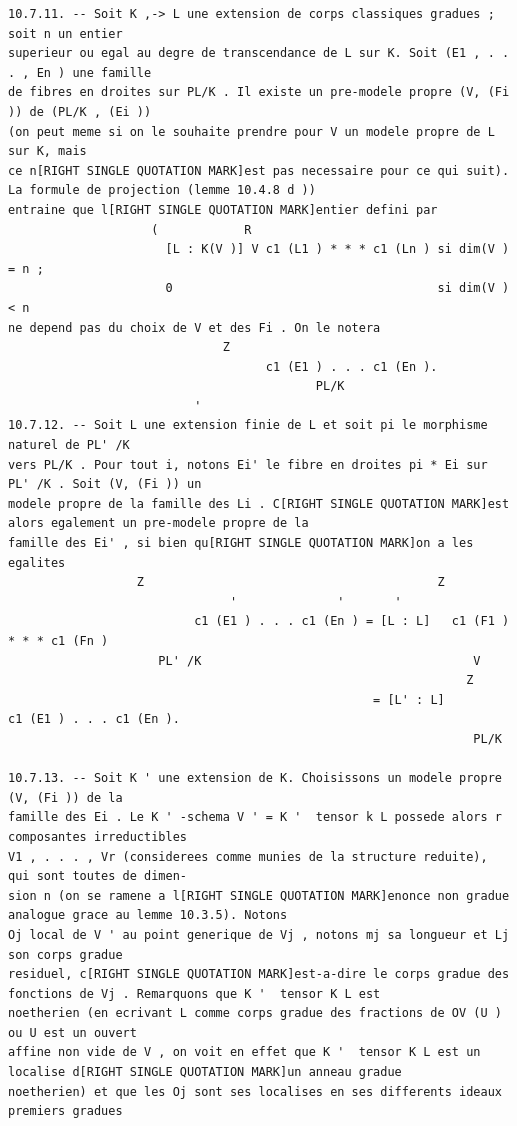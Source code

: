 \documentclass[
  11pt,
]{article}
\begin{document}
\begin{lstlisting}
10.7.11. -- Soit K ,-> L une extension de corps classiques gradues ; soit n un entier
superieur ou egal au degre de transcendance de L sur K. Soit (E1 , . . . , En ) une famille
de fibres en droites sur PL/K . Il existe un pre-modele propre (V, (Fi )) de (PL/K , (Ei ))
(on peut meme si on le souhaite prendre pour V un modele propre de L sur K, mais
ce n[RIGHT SINGLE QUOTATION MARK]est pas necessaire pour ce qui suit). La formule de projection (lemme 10.4.8 d ))
entraine que l[RIGHT SINGLE QUOTATION MARK]entier defini par
                    (            R
                      [L : K(V )] V c1 (L1 ) * * * c1 (Ln ) si dim(V ) = n ;
                      0                                     si dim(V ) < n
ne depend pas du choix de V et des Fi . On le notera
                              Z
                                    c1 (E1 ) . . . c1 (En ).
                                           PL/K
                          '
10.7.12. -- Soit L une extension finie de L et soit pi le morphisme naturel de PL' /K
vers PL/K . Pour tout i, notons Ei' le fibre en droites pi * Ei sur PL' /K . Soit (V, (Fi )) un
modele propre de la famille des Li . C[RIGHT SINGLE QUOTATION MARK]est alors egalement un pre-modele propre de la
famille des Ei' , si bien qu[RIGHT SINGLE QUOTATION MARK]on a les egalites
                  Z                                         Z
                               '              '       '
                          c1 (E1 ) . . . c1 (En ) = [L : L]   c1 (F1 ) * * * c1 (Fn )
                     PL' /K                                      V
                                                                Z
                                                   = [L' : L]           c1 (E1 ) . . . c1 (En ).
                                                                 PL/K

10.7.13. -- Soit K ' une extension de K. Choisissons un modele propre (V, (Fi )) de la
famille des Ei . Le K ' -schema V ' = K '  tensor k L possede alors r composantes irreductibles
V1 , . . . , Vr (considerees comme munies de la structure reduite), qui sont toutes de dimen-
sion n (on se ramene a l[RIGHT SINGLE QUOTATION MARK]enonce non gradue analogue grace au lemme 10.3.5). Notons
Oj local de V ' au point generique de Vj , notons mj sa longueur et Lj son corps gradue
residuel, c[RIGHT SINGLE QUOTATION MARK]est-a-dire le corps gradue des fonctions de Vj . Remarquons que K '  tensor K L est
noetherien (en ecrivant L comme corps gradue des fractions de OV (U ) ou U est un ouvert
affine non vide de V , on voit en effet que K '  tensor K L est un localise d[RIGHT SINGLE QUOTATION MARK]un anneau gradue
noetherien) et que les Oj sont ses localises en ses differents ideaux premiers gradues


\end{lstlisting}
\end{document}
